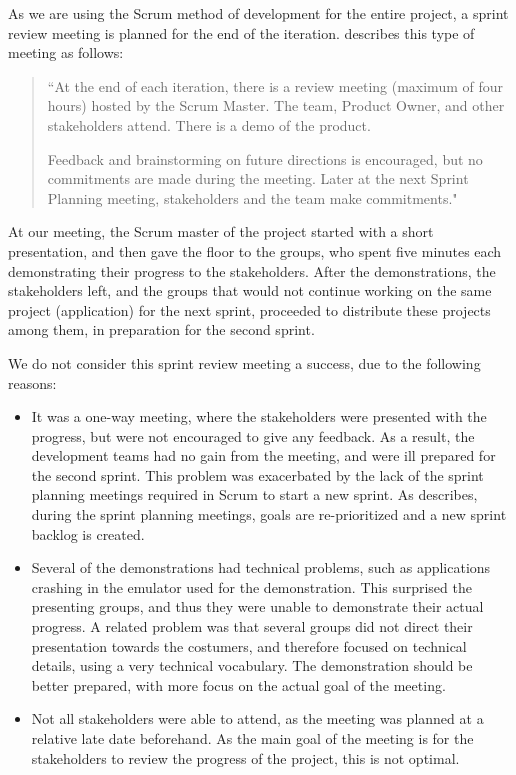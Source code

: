As we are using the Scrum method of development for the entire \giraf project, a sprint review meeting is planned for the end of the iteration. 
\citet[p. 71]{larmanAgile} describes this type of meeting as follows:
\begin{quote}
``At the end of each iteration, there is a review meeting (maximum of four hours)
hosted by the Scrum Master.
The team, Product Owner, and other stakeholders attend.
There is a demo of the product.

Feedback and brainstorming on future directions is encouraged, but no commitments are made during the meeting.
Later at the next Sprint Planning meeting, stakeholders and the team make commitments."
\end{quote}

At our meeting, the Scrum master of the \giraf project started with a short presentation, and then gave the floor to the groups, who spent five minutes each demonstrating their progress to the stakeholders. 
After the demonstrations, the stakeholders left, and the groups that would not continue working on the same project (\giraf application) for the next sprint, proceeded to distribute these projects among them, in preparation for the second sprint.

We do not consider this sprint review meeting a success, due to the following reasons:
\begin{itemize}
	\item It was a one-way meeting, where the stakeholders were presented with the progress, but were not encouraged to give any feedback. 
	As a result, the development teams had no gain from the meeting, and were ill prepared for the second sprint. 
	This problem was exacerbated by the lack of the sprint planning meetings required in Scrum to start a new sprint.
	As \citet[p. 70]{larmanAgile} describes, during the sprint planning meetings, goals are re-prioritized and a new sprint backlog is created. 
	\item Several of the demonstrations had technical problems, such as applications crashing in the emulator used for the demonstration.
	This surprised the presenting groups, and thus they were unable to demonstrate their actual progress.
	A related problem was that several groups did not direct their presentation towards the costumers, and therefore focused on technical details, using a very technical vocabulary.
	The demonstration should be better prepared, with more focus on the actual goal of the meeting.
	\item Not all stakeholders were able to attend, as the meeting was planned at a relative late date beforehand.
	As the main goal of the meeting is for the stakeholders to review the progress of the project, this is not optimal.
\end{itemize}

